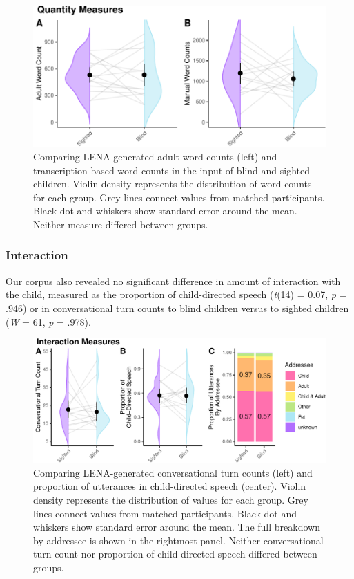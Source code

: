 \documentclass[
  man]{apa6}
\begin{document}
\begin{figure}
\centering
\includegraphics{input_quality_manuscript_files/figure-latex/quantity-plots-1.pdf}
\caption{\label{fig:quantity-plots}Comparing LENA-generated adult word counts (left) and transcription-based word counts in the input of blind and sighted children. Violin density represents the distribution of word counts for each group. Grey lines connect values from matched participants. Black dot and whiskers show standard error around the mean. Neither measure differed between groups.}
\end{figure}

\hypertarget{interaction-1}{%
\subsubsection{Interaction}\label{interaction-1}}

Our corpus also revealed no significant difference in amount of interaction with the child, measured as the proportion of child-directed speech (\emph{t}(14) = 0.07, \emph{p} = .946) or in conversational turn counts to blind children versus to sighted children (\emph{W} = 61, \emph{p} = .978).

\begin{figure}
\centering
\includegraphics{input_quality_manuscript_files/figure-latex/interaction-plots-1.pdf}
\caption{\label{fig:interaction-plots}Comparing LENA-generated conversational turn counts (left) and proportion of utterances in child-directed speech (center). Violin density represents the distribution of values for each group. Grey lines connect values from matched participants. Black dot and whiskers show standard error around the mean. The full breakdown by addressee is shown in the rightmost panel. Neither conversational turn count nor proportion of child-directed speech differed between groups.}
\end{figure}
\end{document}
